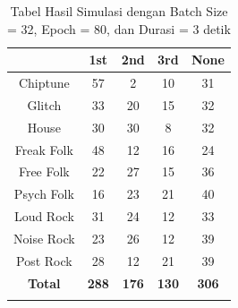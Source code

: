 \begin{longtable}[c]{|c|c|c|c|c|}
	\hline
	\textbf{}      & \textbf{1st} & \textbf{2nd} & \textbf{3rd} & \textbf{None} \\ \hline
	\endfirsthead
	\endhead
	Chiptune       & 57           & 2            & 10           & 31            \\ \hline
	Glitch         & 33           & 20           & 15           & 32            \\ \hline
	House          & 30           & 30           & 8            & 32            \\ \hline
	Freak Folk     & 48           & 12           & 16           & 24            \\ \hline
	Free Folk      & 22           & 27           & 15           & 36            \\ \hline
	Psych Folk     & 16           & 23           & 21           & 40            \\ \hline
	Loud Rock      & 31           & 24           & 12           & 33            \\ \hline
	Noise Rock     & 23           & 26           & 12           & 39            \\ \hline
	Post Rock      & 28           & 12           & 21           & 39            \\ \hline
	\textbf{Total} & \textbf{288} & \textbf{176} & \textbf{130} & \textbf{306}  \\ \hline
	\caption{Tabel Hasil Simulasi dengan Batch Size = 32, Epoch = 80, dan Durasi = 3 detik}
	\label{tab:my-table}\\
\end{longtable}

